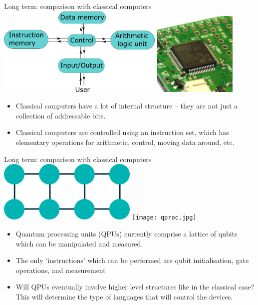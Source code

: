 \documentclass{beamer}
\begin{document}
\begin{frame}{Long term: comparison with classical computers}
  \includegraphics[width=0.6\textwidth]{Harvard_architecture.png}
  \hfill
  \includegraphics[width=0.3\textwidth]{micro.jpg} \cite{armchip}
  \begin{itemize}
  \item Classical computers have a lot of internal structure -- they are not just a collection of addressable bits.
  \item Classical computers are controlled using an instruction set, which has elementary operations for arithmetic, control, moving data around, etc.
  \end{itemize}
\end{frame}

\begin{frame}{Long term: comparison with classical computers}
  \includegraphics[width=0.5\textwidth]{nearestneighbourcon.png}
  \hfill
  \texttt{[image: qproc.jpg]} \cite{supercondpic}
  \begin{itemize}
  \item Quantum processing units (QPUs) currently comprise a lattice of qubits which can be manipulated and measured.
  \item The only `instructions' which can be performed are qubit initialisation, gate operations, and measurement
  \item Will QPUs eventually involve higher level structures like in the classical case? This will determine the type of languages that will control the devices.
  \end{itemize}
\end{frame}
\end{document}
